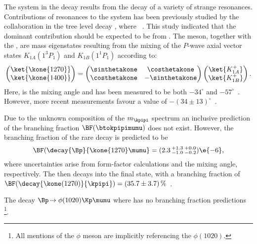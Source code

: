 The \kpipi system in the decay \btokpipimumu results from the decay of a variety of strange
resonances.
Contributions of resonances to the \kpipi system has been previously studied by the \belle
collaboration in the tree level decay \btojpsikpipi, where \jpsitomumu~\cite{Guler:2010if}.
This study indicated that the dominant contribution should be expected
to be from .
The  meson, together with the , are mass eigenstates resulting from the
mixing of the $P$-wave axial vector states $K_{1A}(1^3P_1)$ and $K_{1B}(1^1P_1)$ according to:
\begin{equation}
  \begin{pmatrix}
    \ket{\kone{1270}} \\
    \ket{\kone{1400}}
  \end{pmatrix}
  =
  \begin{pmatrix}
    \sinthetakone & \costhetakone \\
    \costhetakone & -\sinthetakone
  \end{pmatrix}
  \begin{pmatrix}
    \ket{K_{1A}^+} \\
    \ket{K_{1B}^+}
  \end{pmatrix}.
  \label{eq:k1mixing}
\end{equation}
Here, \thetakone is the mixing angle and has been measured to be both $-34^\circ$ and
$-57^\circ$~\cite{PhysRevD.47.1252,Tayduganov:2011ui,Hatanaka:2008xj,Cheng:2011pb,Divotgey:2013jba,Cheng:2013cwa}.
However, more recent measurements favour a value of
$-(34\pm13)^\circ$~\cite{Hatanaka:2008xj,Cheng:2011pb,Divotgey:2013jba,Cheng:2013cwa}.

Due to the unknown composition of the $m_\kpipi$ spectrum an inclusive prediction of the branching
fraction $\BF(\btokpipimumu)$ does not exist.
However, the branching fraction of the rare decay  is predicted to
be~\cite{Hatanaka:2008gu}
\begin{equation}
  \BF(\decay{\Bp}{\kone{1270}\mumu} = (2.3\,^{+1.3}_{-1.0}\,^{+0.0}_{-0.2})\e{-6},
\end{equation}
where uncertainties arise from form-factor calculations and the mixing angle, respectively.
The  then decays into the \kpipi final state, with a branching fraction of
$\BF(\decay{\kone(1270)}{\kpipi})=(35.7\pm3.7)\,\%$~\cite{PDG2012}.

The decay $\Bp\!\to\phi(1020)\Kp\mumu$ where \decay{\phi}{\kk} has no branching fraction
predictions
\footnote{All mentions of the $\phi$ meson are implicitly
  referencing the $\phi(1020)$.
}.

